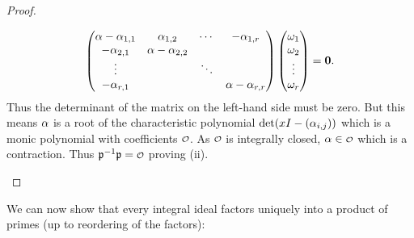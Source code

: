 \begin{proof}
\begin{enumerate}[label=(\roman*)]
        \[
          \begin{pmatrix} \alpha-\alpha_{1,1} & \alpha_{1,2} & \cdots & -\alpha_{1,r} \\ -\alpha_{2,1} & \alpha-\alpha_{2,2} & & \\ \vdots & & \ddots & \\ -\alpha_{r,1} & & & \alpha-\alpha_{r,r} \end{pmatrix}\begin{pmatrix} \omega_{1} \\ \omega_{2} \\ \vdots \\ \omega_{r} \end{pmatrix} = \mathbf{0}.
        \]
        Thus the determinant of the matrix on the left-hand side must be zero. But this means $\alpha$ is a root of the characteristic polynomial $\det(xI-(\alpha_{i,j}))$ which is a monic polynomial with coefficients $\smc{O}$. As $\smc{O}$ is integrally closed, $\a \in \smc{O}$ which is a contraction. Thus $\mf{p}^{-1}\mf{p} = \smc{O}$ proving (ii).
      \end{enumerate}
    \end{proof}

    We can now show that every integral ideal factors uniquely into a product of primes (up to reordering of the factors):

